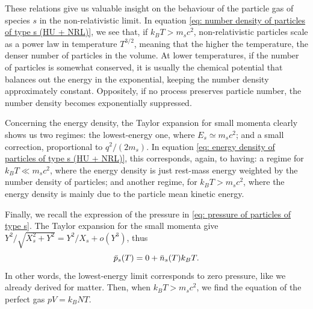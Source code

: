 These relations give us valuable insight on the behaviour of the particle gas of species $s$ in the non-relativistic limit. In equation \eqref{eq: number density of particles of type s (HU + NRL)}, we see that, if $k_BT > m_sc^2$, non-relativistic particles scale as a power law in temperature $T^{3/2}$, meaning that the higher the temperature, the denser number of particles in the volume. At lower temperatures, if the number of particles is somewhat conserved, it is usually the chemical potential that balances out the energy in the exponential, keeping the number density approximately constant. Oppositely, if no process preserves particle number, the number density becomes exponentially suppressed.

Concerning the energy density, the Taylor expansion for small momenta clearly shows us
two regimes: the lowest-energy one, where $E_s \simeq m_sc^2$; and a small correction, proportional to $q^2/(2 m_s)$. In equation \eqref{eq: energy density of particles of type s (HU + NRL)}, this corresponds, again, to having: a regime for $k_BT \ll m_sc^2$, where the energy density is just rest-mass energy weighted by the number density of particles; and another regime, for $k_BT > m_sc^2$, where the energy density is mainly due to the particle mean kinetic energy.

Finally, we recall the expression of the pressure in \eqref{eq: pressure of particles of type s}. The Taylor expansion for the small momenta give $Y^2/\sqrt{X_s^2 + Y^2} = Y^2/X_s + o(Y^3)$, thus 
\begin{equation}
\label{eq: pressure of particles of type s (HU + NRL)}
    \bar{p}_s(T) = 0 + \bar{n}_s(T)k_BT.
\end{equation}
In other words, the lowest-energy limit corresponds to zero pressure, like we already derived for matter. Then, when $k_BT > m_sc^2$, we find the equation of the perfect gas $pV = k_BNT$.

